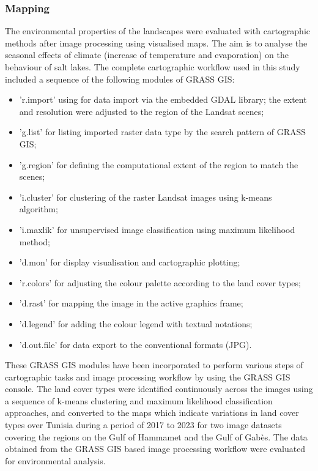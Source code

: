 \documentclass[environments,article,submit,pdftex,moreauthors]{Definitions/mdpi}
\begin{document}
 \subsubsection{Mapping}

The environmental properties of the landscapes were evaluated with cartographic methods after image processing using visualised maps. The aim is to analyse the seasonal effects of climate (increase of temperature and evaporation) on the behaviour of salt lakes. The complete cartographic workflow used in this study included a sequence of the following modules of GRASS GIS:

\begin{itemize}
	\item 'r.import' using for data import via the embedded GDAL library; the extent and resolution were adjusted to the region of the Landsat scenes;
	\item 'g.list' for listing imported raster data type by the search pattern of GRASS GIS; 
	\item 'g.region' for defining the computational extent of the region to match the scenes; 
	\item 'i.cluster' for clustering of the raster Landsat images using k-means algorithm; 
	\item 'i.maxlik' for unsupervised image classification using maximum likelihood method; 
	\item 'd.mon' for display visualisation and cartographic plotting; 
	\item 'r.colors' for adjusting the colour palette according to the land cover types; 
	\item 'd.rast' for mapping the image in the active graphics frame; 
	\item 'd.legend' for adding the colour legend with textual notations; 
	\item 'd.out.file' for data export to the conventional formats (JPG). 
\end{itemize}

These GRASS GIS modules have been incorporated to perform various steps of cartographic tasks and image processing workflow by using the GRASS GIS console. The land cover types were identified continuously across the images using a sequence of k-means clustering and maximum likelihood classification approaches, and converted to the maps which indicate variations in land cover types over Tunisia during a period of 2017 to 2023 for two image datasets covering the regions on the Gulf of Hammamet and the Gulf of Gabès. The data obtained from the GRASS GIS based image processing workflow were evaluated for environmental analysis.
\end{document}
